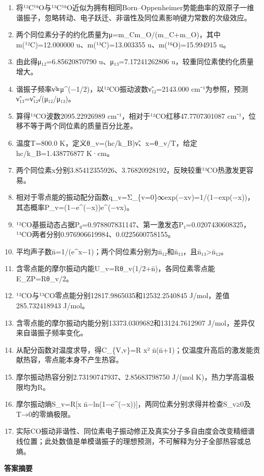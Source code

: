 \documentclass[UTF8,11pt,a4paper]{ctexart}
\begin{document}
\begin{enumerate}
\item 将¹²C¹⁶O与¹³C¹⁶O近似为拥有相同Born–Oppenheimer势能曲率的双原子一维谐振子，忽略转动、电子跃迁、非谐性及同位素影响键力常数的次级效应。
\item 两个同位素分子的约化质量为μ=m\_Cm\_O/(m\_C+m\_O)，其中m(¹²C)=12.000000 u、m(¹³C)=13.003355 u、m(¹⁶O)=15.994915 u。
\item 由此得μ₁₂=6.85620870790 u、μ₁₃=7.17241262806 u，较重同位素使约化质量增大。
\item 谐振子频率ν̃∝μ\textasciicircum{}(−1/2)，以¹²CO振动波数ν̃₁₂=2143.000 cm⁻¹为参照，预测ν̃₁₃=ν̃₁₂√(μ₁₂/μ₁₃)。
\item 算得¹³CO波数2095.22926989 cm⁻¹，相对于¹²CO红移47.7707301087 cm⁻¹，位移不等于两个同位素的质量百分比差。
\item 温度T=800.0 K，定义θ\_v=(hc/k\_B)ν̃、x=θ\_v/T，给定hc/k\_B=1.438776877 K·cm。
\item 两个同位素x分别3.85412355926、3.76820928192，反映较重¹³CO热激发更容易。
\item 相对于零点能的振动配分函数q\_v=Σ\_\{v=0\}∞exp(−xv)=1/(1−exp(−x))，其态概率P\_v=(1−e\textasciicircum{}(−x))e\textasciicircum{}(−vx)。
\item ¹²CO基振动态占据P₀=0.978807831147、第一激发态P₁=0.0207430608325，¹³CO两者分别0.976906619984、0.0225600758155。
\item 平均声子数n̄=1/(e\textasciicircum{}x−1)；两个同位素分别为n̄₁₂和n̄₁₃，且n̄₁₃>n̄₁₂。
\item 含零点能的摩尔振动内能U\_v=Rθ\_v(1/2+n̄)，各同位素零点能E\_ZP=Rθ\_v/2。
\item ¹²CO与¹³CO零点能分别12817.9865035和12532.2540845 J/mol，差值285.732418943 J/mol。
\item 含零点能的摩尔振动内能分别13373.0309682和13124.7612907 J/mol，差异仅来自谐振子频率变化。
\item 从配分函数对温度求导，得C\_\{V,v\}=R x² n̄(n̄+1)；仅温度升高后的激发能贡献热容，零点能本身不产生热容。
\item 摩尔振动热容分别2.73190747937、2.85683798750 J/(mol K)，热力学高温极限均为R。
\item 摩尔振动熵S\_v=R[x n̄−ln(1−e\textasciicircum{}(−x))]，两同位素分别求得并检查S\_v≥0及T→0的零熵极限。
\item 实际CO振动非谐性、同位素电子振动修正及真实分子多自由度会改变精细谱线位置；此处数值是单模谐振子的理想预测，不可解释为分子全部热容或总熵。
\end{enumerate}
\noindent\textbf{答案摘要}\par
\end{document}
